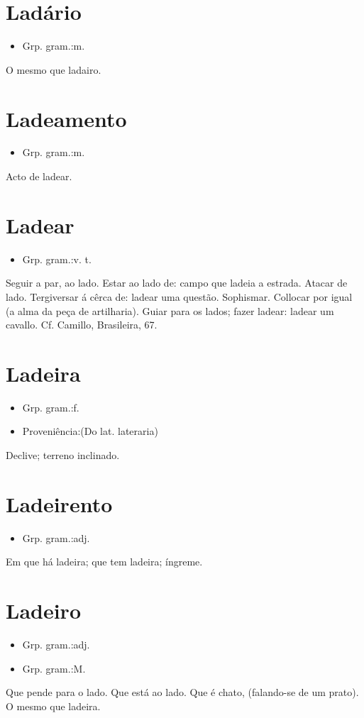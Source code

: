 \section{Ladário}
\begin{itemize}
\item {Grp. gram.:m.}
\end{itemize}
O mesmo que \textunderscore ladairo\textunderscore .
\section{Ladeamento}
\begin{itemize}
\item {Grp. gram.:m.}
\end{itemize}
Acto de ladear.
\section{Ladear}
\begin{itemize}
\item {Grp. gram.:v. t.}
\end{itemize}
Seguir a par, ao lado.
Estar ao lado de: \textunderscore campo que ladeia a estrada\textunderscore .
Atacar de lado.
Tergiversar á cêrca de: \textunderscore ladear uma questão\textunderscore .
Sophismar.
Collocar por igual (a alma da peça de artilharia).
Guiar para os lados; fazer ladear: \textunderscore ladear um cavallo\textunderscore . Cf. Camillo, \textunderscore Brasileira\textunderscore , 67.
\section{Ladeira}
\begin{itemize}
\item {Grp. gram.:f.}
\end{itemize}
\begin{itemize}
\item {Proveniência:(Do lat. \textunderscore lateraria\textunderscore )}
\end{itemize}
Declive; terreno inclinado.
\section{Ladeirento}
\begin{itemize}
\item {Grp. gram.:adj.}
\end{itemize}
Em que há ladeira; que tem ladeira; íngreme.
\section{Ladeiro}
\begin{itemize}
\item {Grp. gram.:adj.}
\end{itemize}
\begin{itemize}
\item {Grp. gram.:M.}
\end{itemize}
Que pende para o lado.
Que está ao lado.
Que é chato, (falando-se de um prato).
O mesmo que \textunderscore ladeira\textunderscore .
